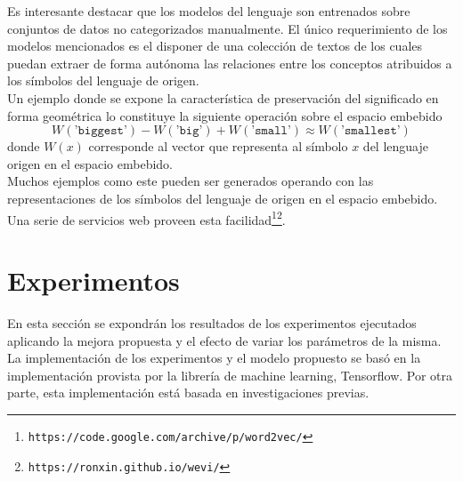 \documentclass{article}
\begin{document}
	Es interesante destacar que los modelos del lenguaje son entrenados sobre conjuntos de datos no categorizados manualmente. El único requerimiento de los modelos mencionados es el disponer de una colección de textos de los cuales puedan extraer de forma autónoma las relaciones entre los conceptos atribuidos a los símbolos del lenguaje de origen.\\
	Un ejemplo donde se expone la característica de preservación del significado en forma geométrica lo constituye la siguiente operación sobre el espacio embebido\\
	\begin{equation*}
	W(\texttt{'biggest'}) -W(\texttt{'big'})+W(\texttt{'small'}) \approx W(\texttt{'smallest'})
	\end{equation*}
	donde $W(x)$ corresponde al vector que representa al símbolo $x$ del lenguaje origen en el espacio embebido.\\
	Muchos ejemplos como este pueden ser generados operando con las representaciones de los símbolos del lenguaje de origen en el espacio embebido. Una serie de servicios web proveen esta facilidad\footnote{\texttt{https://code.google.com/archive/p/word2vec/}}\footnote{\texttt{https://ronxin.github.io/wevi/}}.\\
	
	\section{Experimentos}\label{sectionExperiments}
	En esta sección se expondrán los resultados de los experimentos ejecutados aplicando la mejora propuesta y el efecto de variar los parámetros de la misma.\\
	La implementación de los experimentos y el modelo propuesto se basó en la implementación provista por la librería de machine learning, Tensorflow. Por otra parte, esta implementación está basada en investigaciones previas\cite{14RegularizationZaremba}.\\
	
\end{document}
